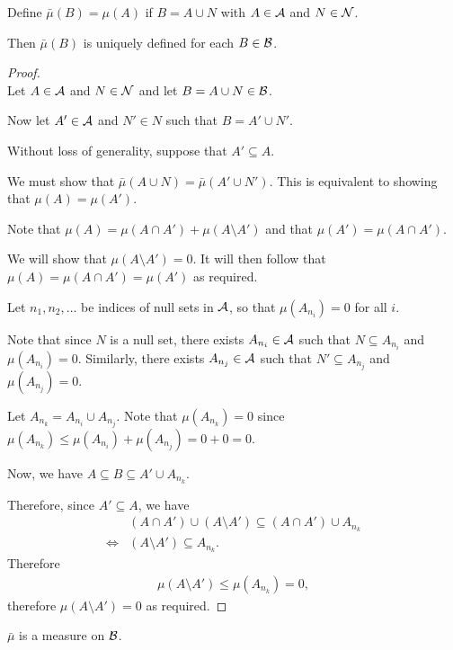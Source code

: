 \begin{claim*}
  Define $\bar{\mu}(B) = \mu(A)$ if $B = A \cup N$ with $A \in \mathcal A$ and $N \in \mathcal N$.

  Then $\bar{\mu}(B)$ is uniquely defined for each $B \in \mathcal B$.
\end{claim*}

\begin{proof}~\\
  Let $A \in \mathcal A$ and $N \in \mathcal N$ and let $B = A \cup N \in \mathcal B$.

  Now let $A' \in \mathcal A$ and $N' \in N$ such that $B = A' \cup N'$.

  Without loss of generality, suppose that $A' \subseteq A$.

  We must show that $\bar{\mu}(A \cup N) = \bar{\mu}(A' \cup N')$. This is equivalent to showing
  that $\mu(A) = \mu(A')$.

  Note that $\mu(A) = \mu(A \cap A') + \mu(A \setminus A')$ and that $\mu(A') = \mu(A \cap A')$.

  We will show that $\mu(A \setminus A') = 0$. It will then follow that $\mu(A) = \mu(A \cap A') = \mu(A')$ as
  required.

  Let $n_1, n_2, \ldots$ be indices of null sets in $\mathcal A$, so that $\mu(A_{n_i}) = 0$ for all $i$.

  Note that since $N$ is a null set, there exists $A_{n_i} \in \mathcal A$ such that $N \subseteq A_{n_i}$
  and $\mu(A_{n_i}) = 0$. Similarly, there exists $A_{n_j} \in \mathcal A$ such that $N' \subseteq A_{n_j}$
  and $\mu(A_{n_j}) = 0$.

  Let $A_{n_k} = A_{n_i} \cup A_{n_j}$. Note that $\mu(A_{n_k}) = 0$
  since $\mu(A_{n_k}) \leq \mu(A_{n_i}) + \mu(A_{n_j}) = 0 + 0 = 0$.

  Now, we have $A \subseteq B \subseteq A' \cup A_{n_k}$.

  Therefore, since $A' \subseteq A$, we have
  \begin{align*}
        &(A \cap A') \cup (A \setminus A') \subseteq (A \cap A') \cup A_{n_k} \\
    \iff &(A \setminus A') \subseteq A_{n_k}.
  \end{align*}
  Therefore
  \begin{align*}
    \mu(A \setminus A') \leq \mu(A_{n_k}) = 0,
  \end{align*}
  therefore $\mu(A \setminus A') = 0$ as required.
\end{proof}

\begin{claim*}
  $\bar{\mu}$ is a measure on $\mathcal B$.
\end{claim*}


